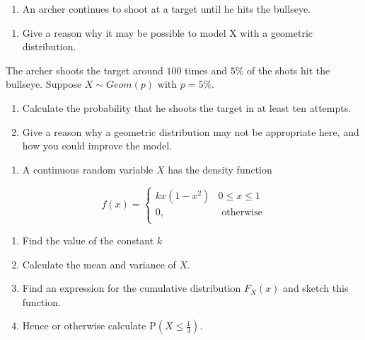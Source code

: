 \documentclass[
]{book}
\providecommand{\tightlist}{%
  \setlength{\itemsep}{0pt}\setlength{\parskip}{0pt}}
\theoremstyle{definition}
\theoremstyle{definition}
\theoremstyle{definition}
\theoremstyle{definition}
\theoremstyle{remark}
\begin{document}
\begin{enumerate}
\def\labelenumi{\arabic{enumi}.}
\tightlist
\item
  An archer continues to shoot at a target until he hits the bullseye.
\end{enumerate}

\begin{enumerate}
\def\labelenumi{\alph{enumi})}
\tightlist
\item
  Give a reason why it may be possible to model X with a geometric
  distribution.
\end{enumerate}

The archer shoots the target around \(100\) times and \(5\%\) of the shots hit the bullseye.
Suppose \(X ∼ Geom(p)\) with \(p =5\%\).

\begin{enumerate}
\def\labelenumi{\alph{enumi})}
\setcounter{enumi}{1}
\item
  Calculate the probability that he shoots the target in at least ten attempts.
\item
  Give a reason why a geometric distribution may not be appropriate here, and how you could improve the model.
\end{enumerate}

\begin{enumerate}
\def\labelenumi{\arabic{enumi}.}
\setcounter{enumi}{1}
\tightlist
\item
  A continuous random variable \(X\) has the density function
\end{enumerate}

\begin{equation*}
  f(x)=\begin{cases}
        kx(1-x^2) & 0\leq x \leq 1 \\
        0 , &  \text{   otherwise}\\
  \end{cases}
\end{equation*}

\begin{enumerate}
\def\labelenumi{\alph{enumi})}
\item
  Find the value of the constant \(k\)
\item
  Calculate the mean and variance of \(X\).
\item
  Find an expression for the cumulative distribution \(F_X(x)\) and sketch this function.
\item
  Hence or otherwise calculate \(\text{P}(X\leq \frac{1}{3})\).
\end{enumerate}
\end{document}
